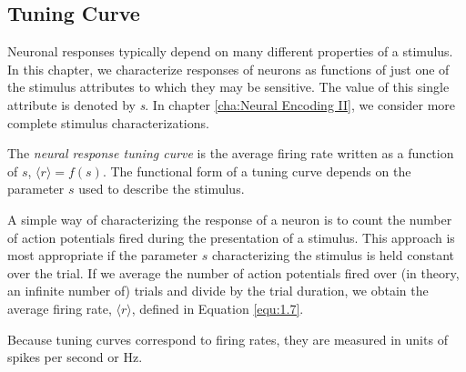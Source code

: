 \subsection{Tuning Curve}

\begin{rem}
  Neuronal responses typically depend on many different properties of a
stimulus. In this chapter, we characterize responses of neurons as functions of 
just one of the stimulus attributes to which they may be sensitive. The value of this 
single attribute is denoted by \emph{s}. In chapter \ref{cha:Neural Encoding II}, we consider
more complete stimulus characterizations.
\end{rem}

\begin{defn}
  The \emph{neural response tuning curve} is the average firing rate written 
  as a function of $s$, $\langle r\rangle =f(s)$. The functional form of a tuning 
  curve depends on the parameter $s$ used to describe the stimulus. 
\end{defn}

\begin{rem}
  A simple way of characterizing the response of a neuron is to count the
number of action potentials fired during the presentation of a stimulus.
This approach is most appropriate if the parameter $s$ characterizing the
stimulus is held constant over the trial. If we average the number of action potentials 
fired over (in theory, an infinite number of) trials and divide by the trial duration, 
we obtain the average firing rate, $ \langle r\rangle$, defined in Equation \ref{equ:1.7}.
\end{rem}

\begin{ntn}
  Because tuning curves correspond to firing rates, they are measured in units of spikes 
  per second or Hz.
\end{ntn}

